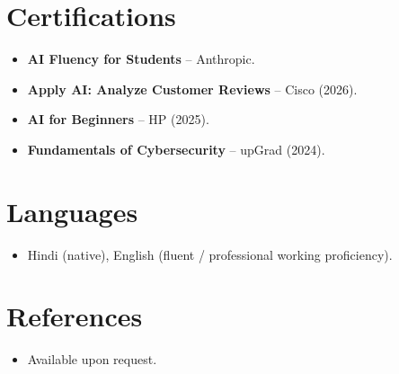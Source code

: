\documentclass[11pt,a4paper,sans]{moderncv}
\begin{document}

\section{Certifications}
\vspace{1pt}
\begin{itemize}
\item{\textbf{AI Fluency for Students} -- Anthropic.}
\item{\textbf{Apply AI: Analyze Customer Reviews} -- Cisco (2026).}
\item{\textbf{AI for Beginners} -- HP (2025).}
\item{\textbf{Fundamentals of Cybersecurity} -- upGrad (2024).}
\end{itemize}


\section{Languages}
\vspace{1pt}
\begin{itemize}
\item{Hindi (native), English (fluent / professional working proficiency).}
\end{itemize}


\section{References}
\vspace{1pt}
\begin{itemize}
\item{Available upon request.}
\end{itemize}
\end{document}
